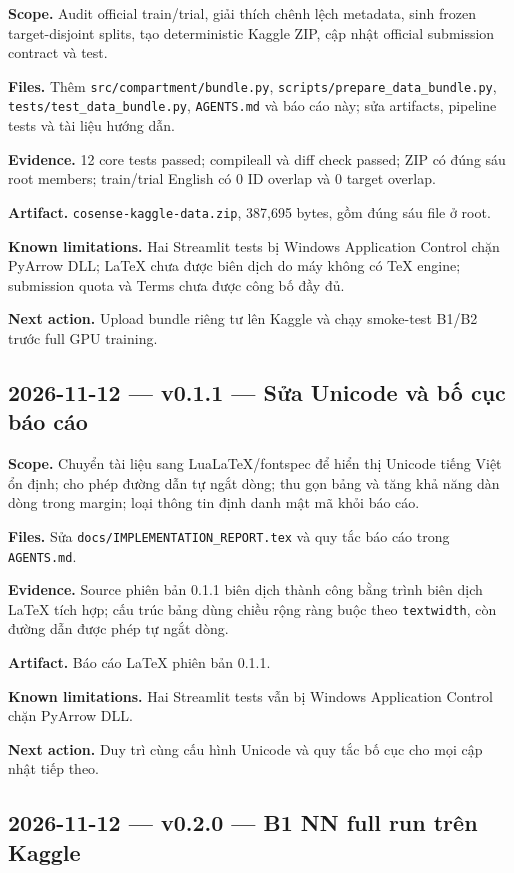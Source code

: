 \documentclass[11pt,a4paper]{article}
\newcommand{\code}[1]{\nolinkurl{#1}}
\begin{document}
\textbf{Scope.} Audit official train/trial, giải thích chênh lệch metadata, sinh frozen target-disjoint splits, tạo deterministic Kaggle ZIP, cập nhật official submission contract và test.

\textbf{Files.} Thêm \code{src/compartment/bundle.py}, \code{scripts/prepare_data_bundle.py}, \code{tests/test_data_bundle.py}, \code{AGENTS.md} và báo cáo này; sửa artifacts, pipeline tests và tài liệu hướng dẫn.

\textbf{Evidence.} 12 core tests passed; compileall và diff check passed; ZIP có đúng sáu root members; train/trial English có 0 ID overlap và 0 target overlap.

\textbf{Artifact.} \code{cosense-kaggle-data.zip}, 387,695 bytes, gồm đúng sáu file ở root.

\textbf{Known limitations.} Hai Streamlit tests bị Windows Application Control chặn PyArrow DLL; LaTeX chưa được biên dịch do máy không có TeX engine; submission quota và Terms chưa được công bố đầy đủ.

\textbf{Next action.} Upload bundle riêng tư lên Kaggle và chạy smoke-test B1/B2 trước full GPU training.

\subsection*{2026-11-12 --- v0.1.1 --- Sửa Unicode và bố cục báo cáo}

\textbf{Scope.} Chuyển tài liệu sang LuaLaTeX/fontspec để hiển thị Unicode tiếng Việt ổn định; cho phép đường dẫn tự ngắt dòng; thu gọn bảng và tăng khả năng dàn dòng trong margin; loại thông tin định danh mật mã khỏi báo cáo.

\textbf{Files.} Sửa \code{docs/IMPLEMENTATION_REPORT.tex} và quy tắc báo cáo trong \code{AGENTS.md}.

\textbf{Evidence.} Source phiên bản 0.1.1 biên dịch thành công bằng trình biên dịch LaTeX tích hợp; cấu trúc bảng dùng chiều rộng ràng buộc theo \code{textwidth}, còn đường dẫn được phép tự ngắt dòng.

\textbf{Artifact.} Báo cáo LaTeX phiên bản 0.1.1.

\textbf{Known limitations.} Hai Streamlit tests vẫn bị Windows Application Control chặn PyArrow DLL.

\textbf{Next action.} Duy trì cùng cấu hình Unicode và quy tắc bố cục cho mọi cập nhật tiếp theo.

\subsection*{2026-11-12 --- v0.2.0 --- B1 NN full run trên Kaggle}
\end{document}
